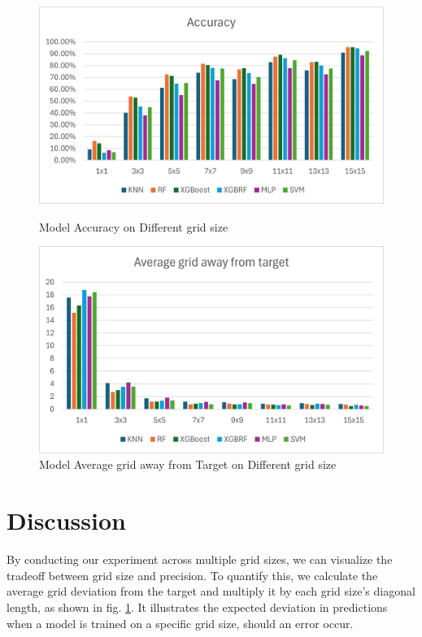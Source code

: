 \documentclass[runningheads]{llncs}
\begin{document}
\begin{figure}[hbt!]
	\begin{minipage}{0.45\textwidth}
		\centering
		\includegraphics[scale=0.5]{image3.png}
		\caption{Model Accuracy on Different grid size}
		\label{fig:acc_dgird_size}
	\end{minipage}
	\hfill
	\begin{minipage}{0.45\textwidth}
		\centering
		\includegraphics[scale=0.5]{image1.png}
		\caption{Model Average grid away from Target on Different grid size}
		\label{fig:AGT_dgrid_size}
	\end{minipage}
\end{figure}

\vspace{-30pt}
\section{Discussion}
\vspace{-10pt}
By conducting our experiment across multiple grid sizes, we can visualize the tradeoff between grid size and precision. To quantify this, we calculate the average grid deviation from the target and multiply it by each grid size’s diagonal length, as shown in fig. \ref{fig:AGT_dgrid_size}. It illustrates the expected deviation in predictions when a model is trained on a specific grid size, should an error occur.
\end{document}
